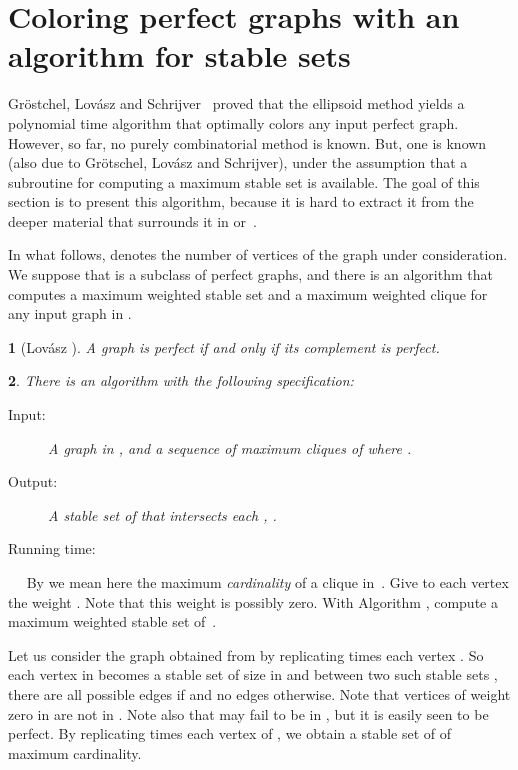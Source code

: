 \documentclass[11 pt] {article}
\newtheorem{theorem}{}[section]
\newtheorem{lemma}[theorem]{}
\newcounter{claim}
\newcommand{\Proof}{\setcounter{claim}{0}\noindent{\bf Proof.}\ \ }
\begin{document}
\section{Coloring perfect graphs with an algorithm for stable sets}
\label{sec:color}

Gr\"ostchel, Lov\'asz and Schrijver~\cite{gls:color} proved that the
ellipsoid method yields a polynomial time algorithm that optimally
colors any input perfect graph.  However, so far, no purely
combinatorial method is known.  But, one is known (also due to
Gr\"otschel, Lov\'asz and Schrijver), under the assumption that a
subroutine for computing a maximum stable set is available.  The goal
of this section is to present this algorithm, because it is hard to
extract it from the deeper material that surrounds it in
\cite{gls:color} or~\cite{KrSe:colorP}.


In what follows,  denotes the number of vertices of the graph under
consideration.  We suppose that  is a subclass of perfect
graphs, and there is an  algorithm  that computes a
maximum weighted stable set and a maximum weighted clique for any
input graph in .


\begin{theorem}[Lov\'asz \cite{lovasz:nh}]
  \label{th:lovasz}
  A graph is perfect if and only if its complement is perfect.
\end{theorem}

\begin{lemma}
  \label{l:compS}
  There is an algorithm with the following specification:
  \begin{description}
  \item[Input: ] A graph  in , and a sequence
     of maximum cliques of  where .
  \item[Output: ] A stable set of  that intersects each ,
    . 
  \item[Running time: ] 
  \end{description} 
\end{lemma}

\Proof
  By  we mean here the maximum \emph{cardinality} of a
  clique in~.  Give to each vertex  the weight .  Note that this weight is possibly zero.  With
  Algorithm , compute a maximum weighted stable set  of~.

  Let us consider the graph  obtained from  by replicating
   times each vertex . So each vertex  in  becomes a
  stable set  of size  in  and between two such stable sets
  ,  there are all possible edges if  and
  no edges otherwise. Note that vertices of weight zero in 
  are not in . Note also that  may fail to be in ,
  but it is easily seen to be perfect.  By replicating  times
  each vertex  of , we obtain a stable set  of  of
  maximum cardinality.
\end{document}
